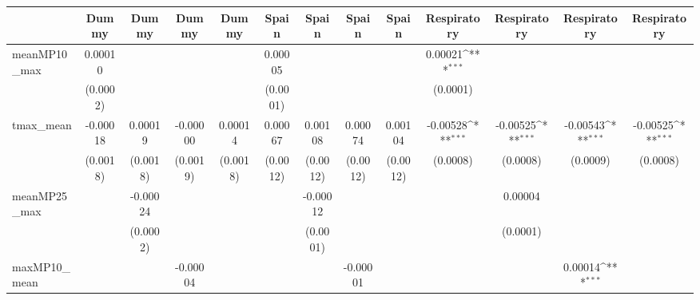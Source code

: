 {
\def\sym#1{\ifmmode^{#1}\else\(^{#1}\)\fi}
\begin{tabular}{l*{12}{c}}
\toprule
            &\multicolumn{1}{c}{Dummy}&\multicolumn{1}{c}{Dummy}&\multicolumn{1}{c}{Dummy}&\multicolumn{1}{c}{Dummy}&\multicolumn{1}{c}{Spain}&\multicolumn{1}{c}{Spain}&\multicolumn{1}{c}{Spain}&\multicolumn{1}{c}{Spain}&\multicolumn{1}{c}{Respiratory}&\multicolumn{1}{c}{Respiratory}&\multicolumn{1}{c}{Respiratory}&\multicolumn{1}{c}{Respiratory}\\
\midrule
meanMP10\_max&     0.00010         &                     &                     &                     &     0.00005         &                     &                     &                     &     0.00021\sym{***}&                     &                     &                     \\
            &    (0.0002)         &                     &                     &                     &    (0.0001)         &                     &                     &                     &    (0.0001)         &                     &                     &                     \\
tmax\_mean   &    -0.00018         &     0.00019         &    -0.00000         &     0.00014         &     0.00067         &     0.00108         &     0.00074         &     0.00104         &    -0.00528\sym{***}&    -0.00525\sym{***}&    -0.00543\sym{***}&    -0.00525\sym{***}\\
            &    (0.0018)         &    (0.0018)         &    (0.0019)         &    (0.0018)         &    (0.0012)         &    (0.0012)         &    (0.0012)         &    (0.0012)         &    (0.0008)         &    (0.0008)         &    (0.0009)         &    (0.0008)         \\
meanMP25\_max&                     &    -0.00024         &                     &                     &                     &    -0.00012         &                     &                     &                     &     0.00004         &                     &                     \\
            &                     &    (0.0002)         &                     &                     &                     &    (0.0001)         &                     &                     &                     &    (0.0001)         &                     &                     \\
maxMP10\_mean&                     &                     &    -0.00004         &                     &                     &                     &    -0.00001         &                     &                     &                     &     0.00014\sym{***}&                     \\

\end{tabular}}
